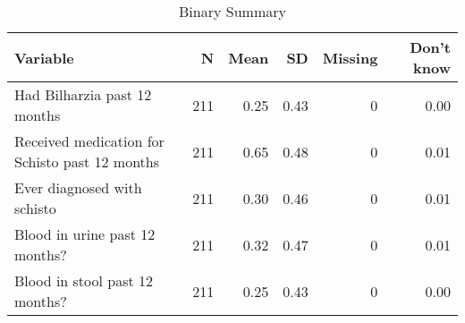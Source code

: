 \begin{table}[!t]
\caption*{
{\large Binary Summary}
} 
\fontsize{12.0pt}{14.4pt}\selectfont
\begin{tabular*}{\linewidth}{@{\extracolsep{\fill}}lrrrrr}
\toprule
Variable & N & Mean & SD & Missing & Don't know \\ 
\midrule\addlinespace[2.5pt]
Had Bilharzia past 12 months & 211 & 0.25 & 0.43 & 0 & 0.00 \\ 
Received medication for Schisto past 12 months & 211 & 0.65 & 0.48 & 0 & 0.01 \\ 
Ever diagnosed with schisto & 211 & 0.30 & 0.46 & 0 & 0.01 \\ 
Blood in urine past 12 months? & 211 & 0.32 & 0.47 & 0 & 0.01 \\ 
Blood in stool past 12 months? & 211 & 0.25 & 0.43 & 0 & 0.00 \\ 
\bottomrule
\end{tabular*}
\end{table}

